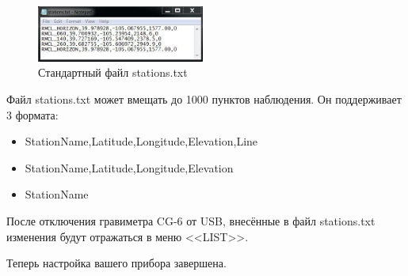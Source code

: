 \begin{figure}[H]
  \centering
  \includegraphics[width=0.49\textwidth]{figures/default_stations.txt_file}
  \caption{Стандартный файл stations.txt}
  \label{fig:default_stations.txt_file}
\end{figure}

Файл stations.txt может вмещать до 1000 пунктов наблюдения. Он поддерживает 3
формата:
\begin{itemize}
  \item StationName,Latitude,Longitude,Elevation,Line
  \item StationName,Latitude,Longitude,Elevation
  \item StationName
\end{itemize}

После отключения гравиметра CG-6 от USB, внесённые в файл stations.txt изменения
будут отражаться в меню <<LIST>>.


Теперь настройка вашего прибора \cg{} завершена.
